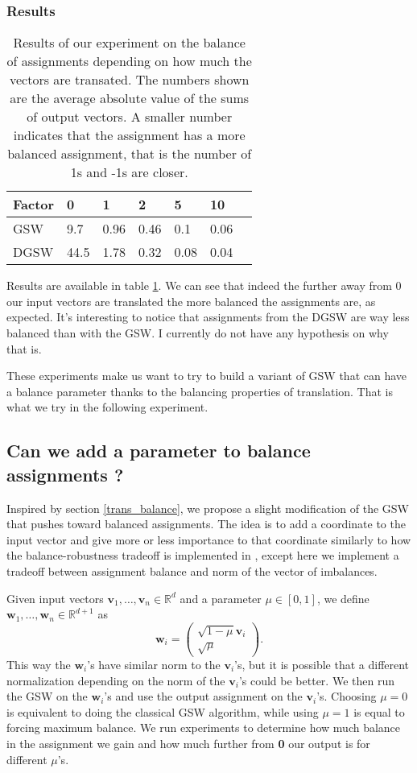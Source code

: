 \documentclass[12pt]{article}
\begin{document}
\subsubsection{Results}
\begin{table}[h!]
\centering
\caption{Results of our experiment on the balance of assignments depending on how much the vectors are transated. The numbers shown are the average absolute value of the sums of output vectors. A smaller number indicates that the assignment has a more balanced assignment, that is the number of 1s and -1s are closer.}
\begin{tabular}{l|llllll}
 Factor & 0 & 1  & 2 & 5 & 10  \\
\hline
GSW  & 9.7 & 0.96 & 0.46 & 0.1 & 0.06 \\
DGSW & 44.5 & 1.78 & 0.32 & 0.08 & 0.04
\end{tabular}
\label{balance_when_translated}\end{table}
Results are available in table \ref{balance_when_translated}. We can see that indeed the further away from 0 our input vectors are translated the more balanced the assignments are, as expected. It's interesting to notice that assignments from the DGSW are way less balanced than with the GSW. I currently do not have any hypothesis on why that is.

These experiments make us want to try to build a variant of GSW that can have a balance parameter thanks to the balancing properties of translation. That is what we try in the following experiment.

\subsection{Can we add a parameter to balance assignments ?}\label{balance_parameter}
Inspired by section \ref{trans_balance}, we propose a slight modification of the GSW that pushes toward balanced assignments. The idea is to add a coordinate to the input vector and give more or less importance to that coordinate similarly to how the balance-robustness tradeoff is implemented in \cite{harshaw2019balancing}, except here we implement a tradeoff between assignment balance and norm of the vector of imbalances.

Given input vectors $\textbf{v}_1,\dots,\textbf{v}_n\in\mathbb{R}^d$ and a parameter $\mu\in[0,1]$, we define $\textbf{w}_1,\dots,\textbf{w}_n\in\mathbb{R}^{d+1}$ as $$\textbf{w}_i=\begin{pmatrix}\sqrt{1-\mu}\textbf{v}_i \\ \sqrt{\mu}\end{pmatrix}.$$ This way the $\textbf{w}_i$'s have similar norm to the $\textbf{v}_i$'s, but it is possible that a different normalization depending on the norm of the $\textbf{v}_i$'s could be better. We then run the GSW on the $\textbf{w}_i$'s and use the output assignment on the $\textbf{v}_i$'s. Choosing $\mu=0$ is equivalent to doing the classical GSW algorithm, while using $\mu=1$ is equal to forcing maximum balance. We run experiments to determine how much balance in the assignment we gain and how much further from \textbf{0} our output is for different $\mu$'s.
\end{document}
